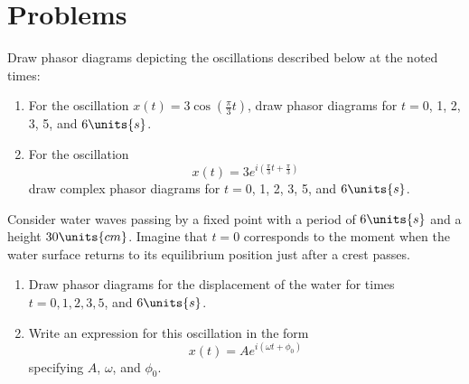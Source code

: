 







\newpage


\section*{Problems}
\label{sec:phasors_problems}


\begin{problem}
Draw phasor diagrams depicting the oscillations described below at the noted times:
  \begin{enumerate}
  \item For the oscillation $x(t) = 3\cos\left(\frac{\pi}{3}t\right)$, draw
phasor diagrams for $t = 0$, 1, 2, 3, 5, and $6\units{s}$.
  \item For the oscillation 
 \[ x(t) = 3e^{i\left(\frac{\pi}{3}t + \frac{\pi}{3}\right)} \]
draw complex phasor diagrams for $t = 0$, 1, 2, 3, 5, and $6\units{s}$.
  \end{enumerate}
\end{problem}


\begin{problem}
Consider water waves passing by a fixed point with a period  
of $6\units{s}$ and a height $30\units{cm}$. Imagine 
that $t=0$ corresponds to the moment when the water surface returns 
to its equilibrium position just after a crest passes.
  \begin{enumerate}
  \item Draw phasor diagrams for the displacement of the water for times 
$t = 0, 1, 2, 3, 5$, and $6\units{s}$.
  \item Write an expression for this oscillation in the form
\[ x(t) = Ae^{i\left(\omega t + \phi_0\right)}   \]
specifying $A$, $\omega$, and $\phi_0$.
  \end{enumerate}
\label{prob:waterwaves}
\end{problem}

